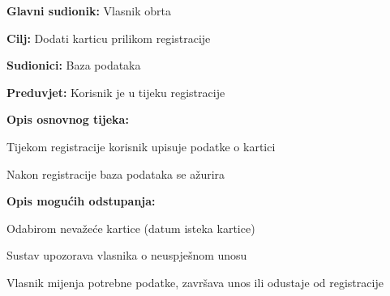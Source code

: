                 \noindent {}
					\begin{packed_item}
	
						\item \textbf{Glavni sudionik: } Vlasnik obrta
						\item \textbf{Cilj:} Dodati karticu prilikom registracije
						\item \textbf{Sudionici:} Baza podataka
						\item \textbf{Preduvjet:} Korisnik je u tijeku registracije
						\item \textbf{Opis osnovnog tijeka:}
						
						\item[] \begin{packed_enum}
	
							\item Tijekom registracije korisnik upisuje podatke o kartici
							\item Nakon registracije baza podataka se ažurira
						
						\end{packed_enum}
						
						\item  \textbf{Opis mogućih odstupanja:}
						
						\item[] \begin{packed_item}
	
							\item[1.a] Odabirom nevažeće kartice (datum isteka kartice)
							\item[] \begin{packed_enum}
								
								\item Sustav upozorava vlasnika o neuspješnom unosu
								\item Vlasnik mijenja potrebne podatke, završava unos ili odustaje od registracije
								
							\end{packed_enum}
						\end{packed_item}
					\end{packed_item}
    
